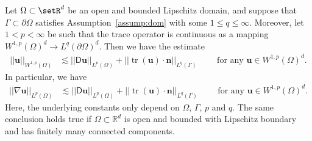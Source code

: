\documentclass[reqno,a4paper]{amsart}
\def\norm#1{\left|\!\left| #1 \right|\!\right|}
\def\tens#1{\pmb{\mathsf{#1}}}
\def\vec#1{\boldsymbol{#1}}
\def\R{\mathbb{R}}
\def\tr{\mathop{\mathrm{tr}}\nolimits}
\def\bn{\vec{n}}
\def\bu{\vec{u}}
\def\BD{\tens{D}}
\begin{document}
	\begin{theorem}\label{thm:korn-n}
		Let $\Omega\subset \setR^d$ be an open and bounded Lipschitz domain, and suppose that $\Gamma\subset\partial\Omega$ satisfies Assumption~\ref{assump:dom} with some $1\leq q \leq\infty$. 
		Moreover, let $1<p<\infty$  be such that the trace operator is continuous as a mapping $ W^{1,p}(\Omega)^{d}\to L^{q}(\partial\Omega)^{d}$. 
		Then we have the estimate
		\begin{align}\label{eq:kornetto0}
			\norm{\bu}_{W^{1,p}(\Omega)} &\lesssim \norm{\BD \bu}_{L^p(\Omega)} + \norm{\tr(\bu)\cdot \bn}_{L^q(\Gamma)}\qquad \text{ for any } \bu \in W^{1,p}(\Omega)^{d}. 
		\end{align}
		In particular, we have  
		\begin{align}\label{eq:kornetto}
			\norm{\nabla \bu}_{L^p(\Omega)} &\lesssim \norm{\BD \bu}_{L^p(\Omega)} + \norm{\tr(\bu)\cdot \bn}_{L^q(\Gamma)}\qquad \text{ for any } \bu \in W^{1,p}(\Omega)^{d}.
		\end{align}
		Here, the underlying constants only depend on $\Omega$, $\Gamma$, $p$ and $q$. The same conclusion holds true if $\Omega\subset\R^{d}$ is open and bounded with Lipschitz boundary and has finitely many connected components. 
	\end{theorem}
\end{document}
